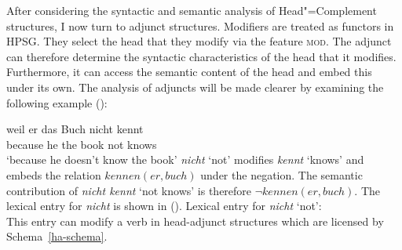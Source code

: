 After considering the syntactic and semantic analysis of Head"=Complement structures, I now turn to adjunct
structures.
%
Modifiers are treated as functors in HPSG. They select the head that they modify via the feature \textsc{mod}. The
adjunct can therefore determine the syntactic characteristics of the head that it modifies. Furthermore, it can access
the semantic content of the head and embed this under its own. The analysis of adjuncts will be made clearer by examining
the following example ():

\ea
\gll weil er das Buch nicht kennt\\
	 because he the book not knows\\
\glt `because he doesn't know the book'
\z
%
\emph{nicht} `not' modifies \emph{kennt} `knows' and embeds the relation $kennen(er, buch)$ under the
negation. The semantic contribution of \emph{nicht kennt} `not knows' is therefore $\neg kennen(er, buch)$.
The lexical entry for \emph{nicht} is shown in ().
\ea
Lexical entry for \emph{nicht} `not':\\
\z
This entry can modify a verb in head-adjunct structures which are licensed by Schema~\ref{ha-schema}.

\begin{samepage}
\begin{schema}
\label{ha-schema}
 \impl\\
\end{schema}
\end{samepage}


